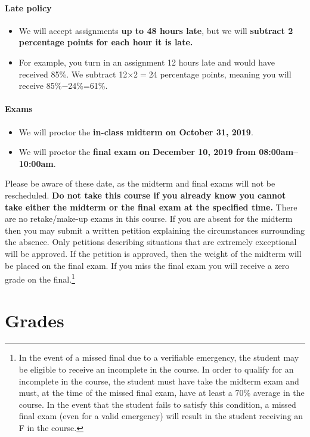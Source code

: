 \documentclass[10pt]{article}
\begin{document}
\paragraph{Late policy}
\begin{itemize}
  \item We will accept assignments \textbf{up to 48 hours late}, but we will \textbf{subtract 2 percentage points for each hour it is late.}
  \item For example, you turn in an assignment 12 hours late and would have received 85\%. We subtract 12$\times$2$=$24 percentage points, meaning you will receive 85\%$-$24\%=61\%.
\end{itemize}

\paragraph{Exams}
\begin{itemize}
  \item We will proctor the \textbf{in-class midterm on October 31, 2019}.
  \item We will proctor the \textbf{final exam on December 10, 2019 from 08:00am--10:00am}.
\end{itemize}

Please be aware of these date, as the midterm and final exams will not be rescheduled. {\bf{Do not take this course if you already know you cannot take either the midterm or the final exam at the specified time.}} There are no retake/make-up exams in this course. If you are absent for the midterm then you may submit a written petition explaining the circumstances surrounding the absence. Only petitions describing situations that are extremely exceptional will be approved. If the petition is approved, then the weight of the midterm will be placed on the final exam. If you miss the final exam you will receive a zero grade on the final.\footnote{In the event of a missed final due to a verifiable emergency, the student may be eligible to receive an incomplete in the course. In order to qualify for an incomplete in the course, the student must have take the midterm exam and must, at the time of the missed final exam, have at least a 70\% average in the course. In the event that the student fails to satisfy this condition, a missed final exam (even for a valid emergency) will result in the student receiving an F in the course.} 

\section*{Grades}
\end{document}
